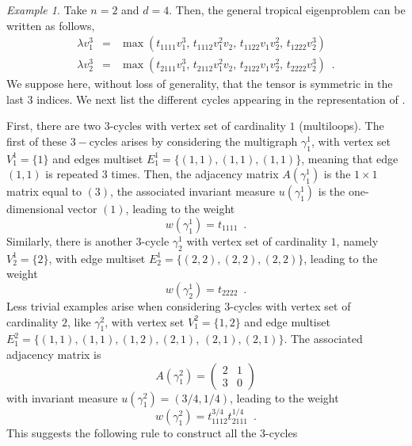 \documentclass{amsart}
\newcommand{\0}{\mathbf{0}}
\newcommand{\1}{\mathbf{1}}
\theoremstyle{remark}
\newtheorem{example}{Example}
\numberwithin{equation}{section} %
\begin{document}
\begin{example}
  Take $n=2$ and $d=4$. Then, the general tropical eigenproblem
  can be written as follows, 
\begin{eqnarray}
  \lambda v_1^3 & =& \max(t_{1111}v_1^3,\,
   t_{1112}v_1^2v_2, \, t_{1122}v_1v_2^2,\,
  t_{1222}v_2^3)\label{e-eq-t1}
\\
\lambda v_2^3 &=&
\max(t_{2111}v_1^3,\,
  t_{2112}v_1^2v_2, \, t_{2122}v_1v_2^2,\,
  t_{2222}v_2^3)
\enspace .\label{e-eq-t2}
\end{eqnarray}
We suppose here, without loss of generality, that the tensor
is symmetric in the last $3$ indices.
%
%
%
%
%
We next list the different cycles appearing in the representation
of .

First, there are two $3$-cycles with vertex set of cardinality $1$ (multiloops).
The first of these $3-$cycles arises by considering the multigraph $\gamma^1_1$, with vertex set $V_1^1=\{1\}$ and edges multiset $E^1_1=\{(1,1), (1,1),(1,1)\}$, meaning that edge $(1,1)$ is repeated $3$ times.
Then, the adjacency matrix $A(\gamma^1_1)$ is the $1\times 1$ matrix equal to $(3)$, the associated invariant measure $u(\gamma^1_1)$ is the one-dimensional vector $(1)$, leading to the weight
%
%
  \begin{equation}
       w(\gamma^1_1)  =t_{1111} \enspace .\label{e-gamma1}
  \end{equation}
  Similarly, there is another $3$-cycle $\gamma^1_2$ with vertex
  set of cardinality $1$, namely $V^1_2=\{2\}$,
  with edge multiset $E^1_2=\{(2,2),(2,2),(2,2)\}$,
  leading to the weight
    \begin{equation}
       w(\gamma^1_2)  =t_{2222} \enspace .\label{e-gamma2new}
    \end{equation}
    Less trivial examples arise when considering $3$-cycles
    with vertex set of cardinality $2$, like $\gamma_1^2$,
    with vertex set $V^2_1=\{1,2\}$ and edge multiset
    $E^2_1=\{(1,1),(1,1), (1,2),
  (2,1)$, $(2,1),(2,1)\}$. The associated adjacency matrix is
  \[
  A(\gamma_1^2)= \left(\begin{array}{cc} 2 & 1 \\
    3 & 0 \end{array}\right)
  \]
  with invariant measure $u(\gamma^2_1)= (3/4,1/4)$,
  leading to the weight
  \begin{equation}
    w(\gamma_1^2)= t_{1112}^{3/4}t_{2111}^{1/4} \enspace .\label{e-gamma2}
  \end{equation}
  This suggests the following rule to construct all the $3$-cycles

\end{example}
\end{document}
